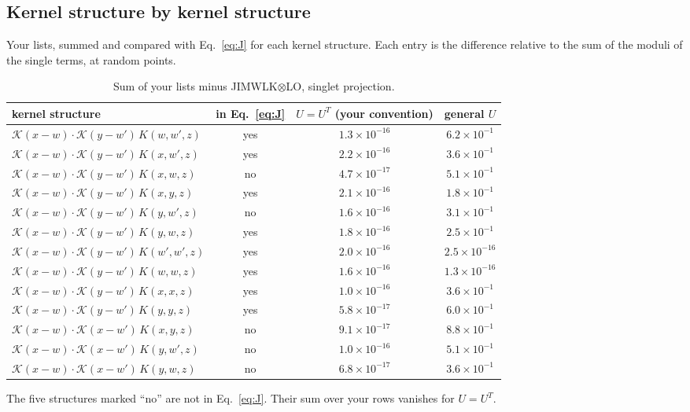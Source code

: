 \documentclass[10pt]{article}
\numberwithin{equation}{section}
\newcommand{\new}[1]{{\color{blue}#1}}
\begin{document}
\subsection{Kernel structure by kernel structure}
Your lists, summed and compared with Eq.~\eqref{eq:J} for each kernel structure. Each entry is the difference relative to the sum of the moduli of the single terms, at random points.
\begin{table}[H]\centering\small
\caption{Sum of your lists minus JIMWLK$\otimes$LO, singlet projection.}\label{tab:kernels}
\begin{tabular}{@{}lccc@{}}\toprule
kernel structure & in Eq.~\eqref{eq:J} & $U=U^T$ (your convention) & general $U$\\\midrule
$\mathcal K(x-w)\cdot\mathcal K(y-w')\,K(w,w',z)$ & yes & \new{$1.3\times10^{-16}$} & $6.2\times10^{-1}$\\
$\mathcal K(x-w)\cdot\mathcal K(y-w')\,K(x,w',z)$ & yes & \new{$2.2\times10^{-16}$} & $3.6\times10^{-1}$\\
$\mathcal K(x-w)\cdot\mathcal K(y-w')\,K(x,w,z)$ & no & \new{$4.7\times10^{-17}$} & $5.1\times10^{-1}$\\
$\mathcal K(x-w)\cdot\mathcal K(y-w')\,K(x,y,z)$ & yes & \new{$2.1\times10^{-16}$} & $1.8\times10^{-1}$\\
$\mathcal K(x-w)\cdot\mathcal K(y-w')\,K(y,w',z)$ & no & \new{$1.6\times10^{-16}$} & $3.1\times10^{-1}$\\
$\mathcal K(x-w)\cdot\mathcal K(y-w')\,K(y,w,z)$ & yes & \new{$1.8\times10^{-16}$} & $2.5\times10^{-1}$\\
$\mathcal K(x-w)\cdot\mathcal K(y-w')\,K(w',w',z)$ & yes & \new{$2.0\times10^{-16}$} & \new{$2.5\times10^{-16}$}\\
$\mathcal K(x-w)\cdot\mathcal K(y-w')\,K(w,w,z)$ & yes & \new{$1.6\times10^{-16}$} & \new{$1.3\times10^{-16}$}\\
$\mathcal K(x-w)\cdot\mathcal K(y-w')\,K(x,x,z)$ & yes & \new{$1.0\times10^{-16}$} & $3.6\times10^{-1}$\\
$\mathcal K(x-w)\cdot\mathcal K(y-w')\,K(y,y,z)$ & yes & \new{$5.8\times10^{-17}$} & $6.0\times10^{-1}$\\
$\mathcal K(x-w)\cdot\mathcal K(x-w')\,K(x,y,z)$ & no & \new{$9.1\times10^{-17}$} & $8.8\times10^{-1}$\\
$\mathcal K(x-w)\cdot\mathcal K(x-w')\,K(y,w',z)$ & no & \new{$1.0\times10^{-16}$} & $5.1\times10^{-1}$\\
$\mathcal K(x-w)\cdot\mathcal K(x-w')\,K(y,w,z)$ & no & \new{$6.8\times10^{-17}$} & $3.6\times10^{-1}$\\
\bottomrule
\end{tabular}
\end{table}
The five structures marked ``no'' are not in Eq.~\eqref{eq:J}. Their sum over your rows vanishes for $U=U^T$.
\end{document}
